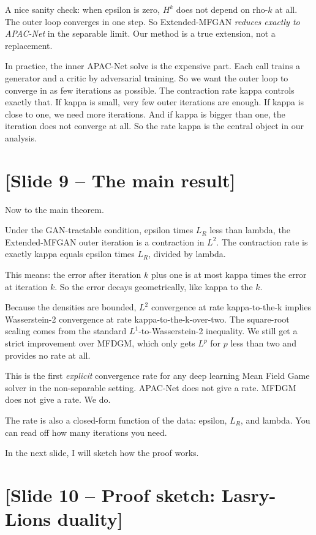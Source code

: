 \documentclass[11pt]{article}
\begin{document}
A nice sanity check: when epsilon is zero, $H^k$ does not depend on rho-$k$
at all. The outer loop converges in one step. So Extended-MFGAN \emph{reduces
exactly to APAC-Net} in the separable limit. Our method is a true extension,
not a replacement.

In practice, the inner APAC-Net solve is the expensive part. Each call
trains a generator and a critic by adversarial training. So we want the
outer loop to converge in as few iterations as possible. The contraction
rate kappa controls exactly that. If kappa is small, very few outer
iterations are enough. If kappa is close to one, we need more iterations.
And if kappa is bigger than one, the iteration does not converge at all.
So the rate kappa is the central object in our analysis.

\section*{[Slide 9 -- The main result]}

Now to the main theorem.

Under the GAN-tractable condition, epsilon times $L_R$ less than lambda,
the Extended-MFGAN outer iteration is a contraction in $L^2$. The contraction
rate is exactly kappa equals epsilon times $L_R$, divided by lambda.

This means: the error after iteration $k$ plus one is at most kappa times
the error at iteration $k$. So the error decays geometrically, like kappa
to the $k$.

Because the densities are bounded, $L^2$ convergence at rate kappa-to-the-k
implies Wasserstein-2 convergence at rate kappa-to-the-k-over-two. The
square-root scaling comes from the standard $L^1$-to-Wasserstein-2
inequality. We still get a strict improvement over MFDGM, which only gets
$L^p$ for $p$ less than two and provides no rate at all.

This is the first \emph{explicit} convergence rate for any deep learning
Mean Field Game solver in the non-separable setting. APAC-Net does not give
a rate. MFDGM does not give a rate. We do.

The rate is also a closed-form function of the data: epsilon, $L_R$, and
lambda. You can read off how many iterations you need.

In the next slide, I will sketch how the proof works.

\section*{[Slide 10 -- Proof sketch: Lasry-Lions duality]}
\end{document}

